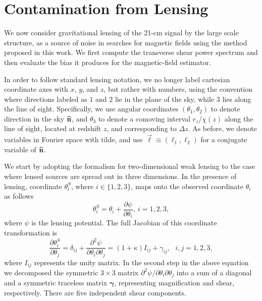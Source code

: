 \section{Contamination from Lensing}

We now consider gravitational lensing of the 21-cm signal by the large scale structure, as a source of noise in searches for magnetic fields using the method proposed in this work. We first compute the transverse shear power spectrum and then evaluate the bias it produces for the magnetic-field estimator.

In order to follow standard lensing notation, we no longer label cartesian coordinate axes with $x$, $y$, and $z$, but rather with numbers, using the convention where directions labeled as $1$ and $2$ lie in the plane of the sky, while $3$ lies along the line of sight. Specifically, we use angular coordinates $(\theta_1, \theta_2)$ to denote direction in the sky ${\bf{\widehat n}}$, and $\theta_3$ to denote a comoving interval $r_z/\chi(z)$ along the line of sight, located at redshift $z$, and corresponding to $\Delta z$. As before, we denote variables in Fourier space with tilde, and use $\vec{\ell}\equiv(\ell_1,\ell_2)$ for a conjugate variable of ${\bf{\widehat n}}$. 
 
We start by adopting the formalism for two-dimensional weak lensing \cite{Weinberg201387} to the case where lensed sources are spread out in three dimensions. In the presence of lensing, coordinate $\theta_i^S$, where $i\in\{1,2,3\}$, maps onto the observed coordinate $\theta_i$ as follows \begin{equation}
\theta_i^S=\theta_i+\frac{\partial\psi}{\partial\theta_i},\ i=1,2,3,
\label{eq:lensingmapping}
\end{equation}
where $\psi$ is the lensing potential. The full Jacobian of this coordinate transformation is
\begin{equation}
\frac{\partial\theta_i^S}{\partial\theta_j}=\delta_{ij}+\frac{\partial^2\psi}{\partial\theta_i\partial\theta_j}=(1+\kappa)I_{ij}+\gamma_{ij},\ \ \ i,j=1,2,3,
\label{eq:lensingtsf}
\end{equation}
where $I_{ij}$ represents the unity matrix. In the second step in the above equation we decomposed the symmetric $3\times 3$ matrix $\partial^2\psi/\partial\theta_i\partial\theta_j$ into a sum of a diagonal and a symmetric traceless matrix $\bm{\gamma}$, representing magnification and shear, respectively. There are five independent shear components.


